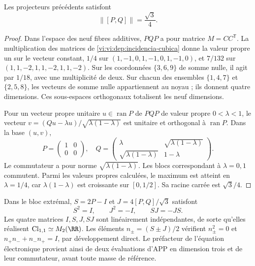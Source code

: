 \begin{proposition}
\label{vi:vi:dep:norma-PQ}
Les projecteurs précédents satisfont
\begin{equation}
 \|[P,Q]\|=\frac{\sqrt3}{4}.
 \label{vi:vi:dep:prefactor-valor}
\end{equation}
\end{proposition}
\begin{proof}
Dans l’espace des neuf fibres additives, \(PQP\) a pour matrice
\(M=CC^{\mathsf T}\). La multiplication des matrices de
\eqref{vi:vi:dep:incidencia-cubica} donne la valeur propre un sur le vecteur
constant, \(1/4\) sur \((1,-1,0,1,-1,0,1,-1,0)\), et
\(7/132\) sur \((1,1,-2,1,1,-2,1,1,-2)\).
Sur les coordonnées \(\{3,6,9\}\) de somme nulle, il agit par
\(1/18\), avec une multiplicité de deux. Sur chacun des ensembles
\(\{1,4,7\}\) et \(\{2,5,8\}\), les vecteurs de somme nulle
appartiennent au noyau ; ils donnent quatre dimensions. Ces sous-espaces
orthogonaux totalisent les neuf dimensions.

Pour un vecteur propre unitaire \(u\in\operatorname{ran}P\) de
\(PQP\) de valeur propre \(0<\lambda<1\), le vecteur
\(v=(Qu-\lambda u)/\sqrt{\lambda(1-\lambda)}\) est unitaire et
orthogonal à \(\operatorname{ran}P\). Dans la base \((u,v)\),
\[
 P=\begin{pmatrix}1&0\\0&0\end{pmatrix},\quad
 Q=\begin{pmatrix}\lambda&\sqrt{\lambda(1-\lambda)}\\
 \sqrt{\lambda(1-\lambda)}&1-\lambda\end{pmatrix}.
\]
Le commutateur a pour norme \(\sqrt{\lambda(1-\lambda)}\).
Les blocs correspondant à \(\lambda=0,1\) commutent. Parmi les
valeurs propres calculées, le maximum est atteint en \(\lambda=1/4\),
car \(\lambda(1-\lambda)\) est croissante sur \([0,1/2]\).
Sa racine carrée est \(\sqrt3/4\).
\end{proof}

Dans le bloc extrémal, \(S=2P-I\) et
\(J=4[P,Q]/\sqrt3\) satisfont
\[
 S^2=I,\qquad J^2=-I,\qquad SJ=-JS.
\]
Les quatre matrices \(I,S,J,SJ\) sont linéairement indépendantes,
de sorte qu’elles réalisent \(\mathrm{Cl}_{1,1}\simeq M_2(\RR)\).
Les éléments \(n_\pm=(S\pm J)/2\) vérifient
\(n_\pm^2=0\) et \(n_+n_-+n_-n_+=I\), par développement direct.
Le préfacteur de l’équation électronique provient ainsi de deux évaluations
d’APP en dimension trois et de leur commutateur, avant toute masse
de référence.

